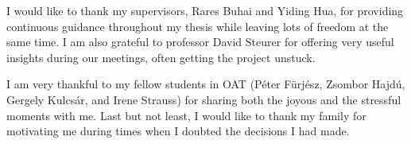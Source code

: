 I would like to thank my supervisors, Rares Buhai and Yiding Hua, for providing continuous guidance throughout my thesis while leaving lots of freedom at the same time. I am also grateful to professor David Steurer for offering very useful insights during our meetings, often getting the project unstuck.

I am very thankful to my fellow students in OAT (Péter Fürjész, Zsombor Hajdú, Gergely Kulcsár, and Irene Strauss) for sharing both the joyous and the stressful moments with me. Last but not least, I would like to thank my family for motivating me during times when I doubted the decisions I had made.